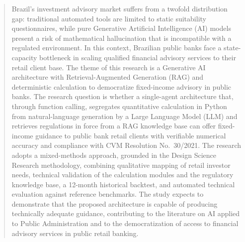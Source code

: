 
\begin{abstract}
Brazil's investment advisory market suffers from a twofold distribution gap:
traditional automated tools are limited to static suitability questionnaires,
while pure Generative Artificial Intelligence (AI) models present a risk of
mathematical hallucination that is incompatible with a regulated environment.
In this context, Brazilian public banks face a state-capacity bottleneck in
scaling qualified financial advisory services to their retail client base. The
theme of this research is a Generative AI architecture with
Retrieval-Augmented Generation (RAG) and deterministic calculation to
democratize fixed-income advisory in public banks. The research question is
whether a single-agent architecture that, through function calling, segregates
quantitative calculation in Python from natural-language generation by a Large
Language Model (LLM) and retrieves regulations in force from a RAG knowledge
base can offer fixed-income guidance to public bank retail clients with
verifiable numerical accuracy and compliance with CVM Resolution No.~30/2021.
The research adopts a mixed-methods approach, grounded in the Design Science
Research methodology, combining qualitative mapping of retail investor needs,
technical validation of the calculation modules and the regulatory knowledge
base, a 12-month historical backtest, and automated technical evaluation
against reference benchmarks. The study expects to demonstrate that the
proposed architecture is capable of producing technically adequate guidance,
contributing to the literature on AI applied to Public Administration and to
the democratization of access to financial advisory services in public retail
banking.
\end{abstract}
